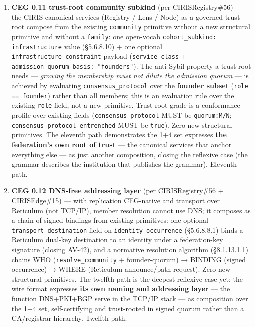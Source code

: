 \documentclass[10pt]{article}
\begin{document}
\begin{enumerate}
\item \textbf{CEG 0.11 trust-root community subkind} (per CIRISRegistry\#56) — the CIRIS canonical services (Registry / Lens / Node) as a governed trust root compose from the existing \texttt{community} primitive without a new structural primitive and without a \texttt{family}: one open-vocab \texttt{cohort\_subkind: infrastructure} value (§5.6.8.10) + one optional \texttt{infrastructure\_constraint} payload (\texttt{service\_class} + \texttt{admission\_quorum\_basis: "founders"}). The anti-Sybil property a trust root needs — \textit{growing the membership must not dilute the admission quorum} — is achieved by evaluating \texttt{consensus\_protocol} over the \textbf{founder subset} (\texttt{role == founder}) rather than all members; this is an evaluation rule over the existing \texttt{role} field, not a new primitive. Trust-root grade is a conformance profile over existing fields (\texttt{consensus\_protocol} MUST be \texttt{quorum:M/N}; \texttt{consensus\_protocol\_entrenched} MUST be \texttt{true}). Zero new structural primitives. The eleventh path demonstrates the 1+4 set expresses \textbf{the federation's own root of trust} — the canonical services that anchor everything else — as just another composition, closing the reflexive case (the grammar describes the institution that publishes the grammar). Eleventh path.
\item \textbf{CEG 0.12 DNS-free addressing layer} (per CIRISRegistry\#56 + CIRISEdge\#15) — with replication CEG-native and transport over Reticulum (not TCP/IP), member resolution cannot use DNS; it composes as a chain of signed bindings from existing primitives: one optional \texttt{transport\_destination} field on \texttt{identity\_occurrence} (§5.6.8.8.1) binds a Reticulum dual-key destination to an identity under a federation-key signature (closing AV-42), and a normative resolution algorithm (§8.1.13.1.1) chains WHO (\texttt{resolve\_community} + founder-quorum) → BINDING (signed occurrence) → WHERE (Reticulum announce/path-request). Zero new structural primitives. The twelfth path is the deepest reflexive case yet: the wire format expresses \textbf{its own naming and addressing layer} — the function DNS+PKI+BGP serve in the TCP/IP stack — as composition over the 1+4 set, self-certifying and trust-rooted in signed quorum rather than a CA/registrar hierarchy. Twelfth path.

\end{enumerate}
\end{document}
